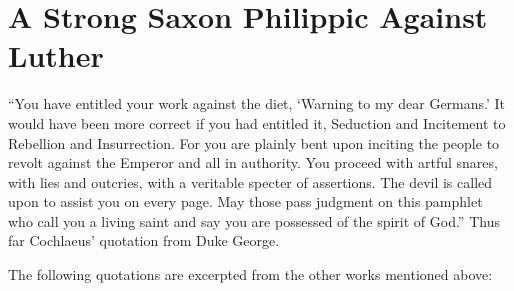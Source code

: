 \section{A Strong Saxon Philippic Against Luther}

“You have entitled your work against the diet, `Warning to my
dear Germans.' It would have been more correct if you had entitled
it, Seduction and Incitement to Rebellion and Insurrection. For you
are plainly bent upon inciting the people to revolt against the Emperor
and all in authority. You proceed with artful snares, with lies
and outcries, with a veritable specter of assertions. The devil is called
upon to assist you on every page. May those pass judgment on
this pamphlet who call you a living saint and say you are possessed
of the spirit of God.” Thus far Cochlaeus’ quotation from Duke
George.

The following quotations are excerpted from the other works mentioned
above:

